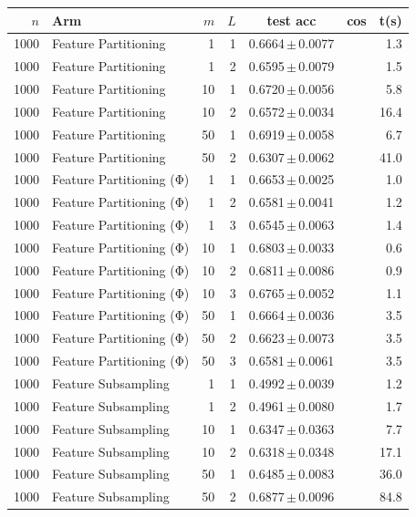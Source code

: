 \begin{table}[ht]
\centering\small
\begin{tabular}{rlrrccr}
\toprule
$n$ & Arm & $m$ & $L$ & test acc & cos & t(s) \\
\midrule
1000 & Feature Partitioning & 1 & 1 & 0.6664\,$\pm$\,0.0077 &  & 1.3 \\
1000 & Feature Partitioning & 1 & 2 & 0.6595\,$\pm$\,0.0079 &  & 1.5 \\
1000 & Feature Partitioning & 10 & 1 & 0.6720\,$\pm$\,0.0056 &  & 5.8 \\
1000 & Feature Partitioning & 10 & 2 & 0.6572\,$\pm$\,0.0034 &  & 16.4 \\
1000 & Feature Partitioning & 50 & 1 & 0.6919\,$\pm$\,0.0058 &  & 6.7 \\
1000 & Feature Partitioning & 50 & 2 & 0.6307\,$\pm$\,0.0062 &  & 41.0 \\
1000 & Feature Partitioning (Φ) & 1 & 1 & 0.6653\,$\pm$\,0.0025 &  & 1.0 \\
1000 & Feature Partitioning (Φ) & 1 & 2 & 0.6581\,$\pm$\,0.0041 &  & 1.2 \\
1000 & Feature Partitioning (Φ) & 1 & 3 & 0.6545\,$\pm$\,0.0063 &  & 1.4 \\
1000 & Feature Partitioning (Φ) & 10 & 1 & 0.6803\,$\pm$\,0.0033 &  & 0.6 \\
1000 & Feature Partitioning (Φ) & 10 & 2 & 0.6811\,$\pm$\,0.0086 &  & 0.9 \\
1000 & Feature Partitioning (Φ) & 10 & 3 & 0.6765\,$\pm$\,0.0052 &  & 1.1 \\
1000 & Feature Partitioning (Φ) & 50 & 1 & 0.6664\,$\pm$\,0.0036 &  & 3.5 \\
1000 & Feature Partitioning (Φ) & 50 & 2 & 0.6623\,$\pm$\,0.0073 &  & 3.5 \\
1000 & Feature Partitioning (Φ) & 50 & 3 & 0.6581\,$\pm$\,0.0061 &  & 3.5 \\
1000 & Feature Subsampling & 1 & 1 & 0.4992\,$\pm$\,0.0039 &  & 1.2 \\
1000 & Feature Subsampling & 1 & 2 & 0.4961\,$\pm$\,0.0080 &  & 1.7 \\
1000 & Feature Subsampling & 10 & 1 & 0.6347\,$\pm$\,0.0363 &  & 7.7 \\
1000 & Feature Subsampling & 10 & 2 & 0.6318\,$\pm$\,0.0348 &  & 17.1 \\
1000 & Feature Subsampling & 50 & 1 & 0.6485\,$\pm$\,0.0083 &  & 36.0 \\
1000 & Feature Subsampling & 50 & 2 & 0.6877\,$\pm$\,0.0096 &  & 84.8 \\

\end{tabular}
\end{table}
